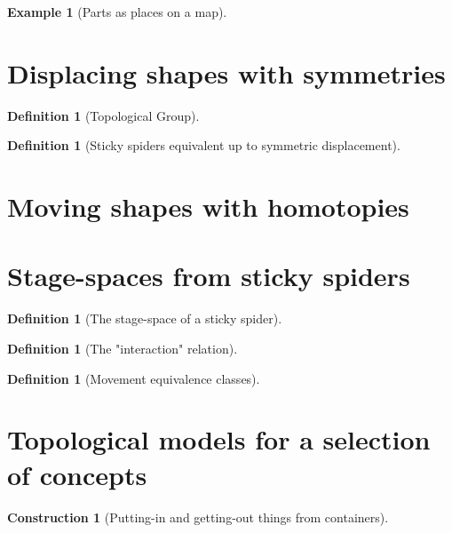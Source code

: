 \documentclass{tufte-handout}
\theoremstyle{definition}
\newtheorem{defn}[theorem]{Definition}
\newtheorem{example}[theorem]{Example}
\newtheorem{construction}[theorem]{Construction}
\begin{document}
\begin{example}[Parts as places on a map]

\end{example}

\section{Displacing shapes with symmetries}

\begin{defn}[Topological Group]

\end{defn}

\begin{defn}[Sticky spiders equivalent up to symmetric displacement]

\end{defn}

\section{Moving shapes with homotopies}



\section{Stage-spaces from sticky spiders}

\begin{defn}[The stage-space of a sticky spider]

\end{defn}

\begin{defn}[The "interaction" relation]

\end{defn}

\begin{defn}[Movement equivalence classes]

\end{defn}

\section{Topological models for a selection of concepts}

\begin{construction}[Putting-in and getting-out things from containers]

\end{construction}
\end{document}

